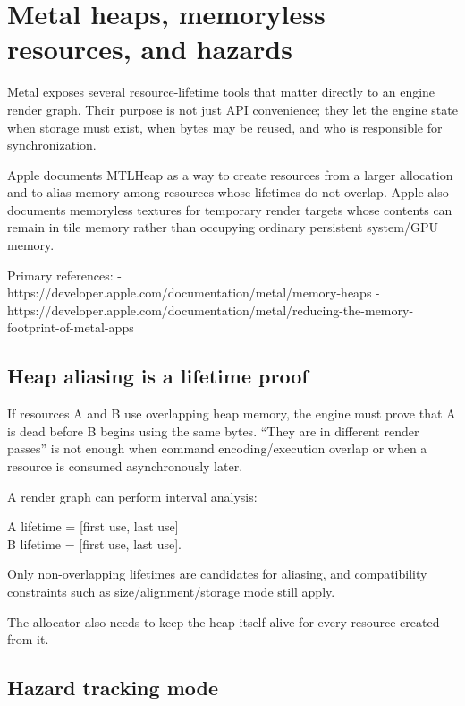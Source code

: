 \hypertarget{appendix-563b2cb23fc3}{}
\section{Metal heaps, memoryless resources, and hazards}\label{appendix-563b2cb23fc3-metal-heaps-memoryless-resources-and-hazards}

Metal exposes several resource-lifetime tools that matter directly to an engine render graph. Their purpose is not just API convenience; they let the engine state when storage must exist, when bytes may be reused, and who is responsible for synchronization.

Apple documents MTLHeap as a way to create resources from a larger allocation and to alias memory among resources whose lifetimes do not overlap. Apple also documents memoryless textures for temporary render targets whose contents can remain in tile memory rather than occupying ordinary persistent system/GPU memory.

Primary references: - https://developer.apple.com/documentation/metal/memory-heaps - https://developer.apple.com/documentation/metal/reducing-the-memory-footprint-of-metal-apps

\subsection{Heap aliasing is a lifetime proof}\label{appendix-563b2cb23fc3-heap-aliasing-is-a-lifetime-proof}

If resources A and B use overlapping heap memory, the engine must prove that A is dead before B begins using the same bytes. ``They are in different render passes'' is not enough when command encoding/execution overlap or when a resource is consumed asynchronously later.

A render graph can perform interval analysis:

A lifetime = {[}first use, last use{]}\\
B lifetime = {[}first use, last use{]}.

Only non-overlapping lifetimes are candidates for aliasing, and compatibility constraints such as size/alignment/storage mode still apply.

The allocator also needs to keep the heap itself alive for every resource created from it.

\subsection{Hazard tracking mode}\label{appendix-563b2cb23fc3-hazard-tracking-mode}

